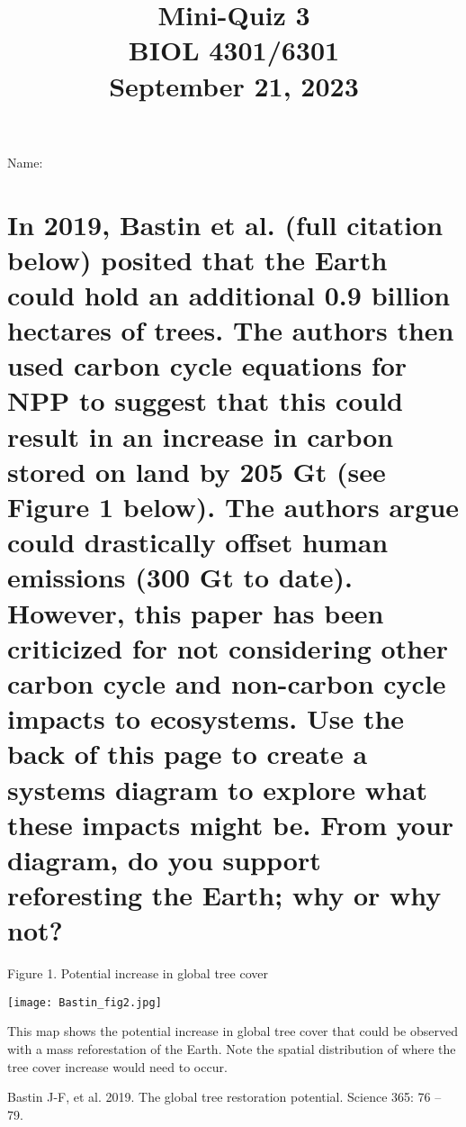 \documentclass[12pt, notitlepage]{article}   	%
\title{
	\textbf{
		Mini-Quiz 3
	} \\
	\large BIOL 4301/6301 \\
	\large September 21, 2023 \\
}
\date{\vspace{-5ex}}
\begin{document}
{\selectfont %

\large{Name:}

{\let\newpage\relax\maketitle}

\section{\small{In 2019, Bastin et al. (full citation below) posited that
the Earth could hold an additional 0.9 billion hectares of trees. The authors
then used carbon cycle equations for NPP to suggest that this could result in an increase
in carbon stored on land by 205 Gt (see Figure 1 below). 
The authors argue could drastically offset human emissions (300 Gt to date). However, this
paper has been criticized for not considering other carbon cycle and non-carbon cycle
impacts to ecosystems. Use the back of this page to create a systems diagram 
to explore what these impacts might be. From your diagram,
do you support reforesting the Earth; why or why not?}}

\small{Figure 1. Potential increase in global tree cover}

\texttt{[image: Bastin\_fig2.jpg]}

\small{This map shows the potential increase in global tree cover that could be observed with a
mass reforestation of the Earth. Note the spatial distribution of where the tree cover increase
would need to occur.}

\small{Bastin J-F, et al. 2019. The global tree restoration potential. Science 365: 76 – 79.}


} %
\end{document}
